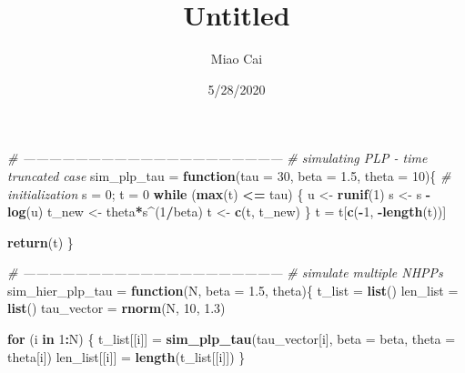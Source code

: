 \documentclass[
]{article}
\title{Untitled}
\author{Miao Cai}
\date{5/28/2020}
\newenvironment{Shaded}{\begin{snugshade}}{\end{snugshade}}
\newcommand{\CommentTok}[1]{\textcolor[rgb]{0.56,0.35,0.01}{\textit{#1}}}
\newcommand{\ControlFlowTok}[1]{\textcolor[rgb]{0.13,0.29,0.53}{\textbf{#1}}}
\newcommand{\DataTypeTok}[1]{\textcolor[rgb]{0.13,0.29,0.53}{#1}}
\newcommand{\DecValTok}[1]{\textcolor[rgb]{0.00,0.00,0.81}{#1}}
\newcommand{\FloatTok}[1]{\textcolor[rgb]{0.00,0.00,0.81}{#1}}
\newcommand{\KeywordTok}[1]{\textcolor[rgb]{0.13,0.29,0.53}{\textbf{#1}}}
\newcommand{\NormalTok}[1]{#1}
\newcommand{\OperatorTok}[1]{\textcolor[rgb]{0.81,0.36,0.00}{\textbf{#1}}}
\newcommand{\StringTok}[1]{\textcolor[rgb]{0.31,0.60,0.02}{#1}}
\begin{document}
\maketitle

\begin{Shaded}
\begin{Highlighting}[]
\CommentTok{# ------------------------------------------------------------}
\CommentTok{# simulating PLP - time truncated case}
\NormalTok{sim_plp_tau =}\StringTok{ }\ControlFlowTok{function}\NormalTok{(}\DataTypeTok{tau =} \DecValTok{30}\NormalTok{,}
                       \DataTypeTok{beta =} \FloatTok{1.5}\NormalTok{,}
                       \DataTypeTok{theta =} \DecValTok{10}\NormalTok{)\{}
  \CommentTok{# initialization}
\NormalTok{  s =}\StringTok{ }\DecValTok{0}\NormalTok{; t =}\StringTok{ }\DecValTok{0}
  \ControlFlowTok{while}\NormalTok{ (}\KeywordTok{max}\NormalTok{(t) }\OperatorTok{<=}\StringTok{ }\NormalTok{tau) \{}
\NormalTok{    u <-}\StringTok{ }\KeywordTok{runif}\NormalTok{(}\DecValTok{1}\NormalTok{)}
\NormalTok{    s <-}\StringTok{ }\NormalTok{s }\OperatorTok{-}\StringTok{ }\KeywordTok{log}\NormalTok{(u)}
\NormalTok{    t_new <-}\StringTok{ }\NormalTok{theta}\OperatorTok{*}\NormalTok{s}\OperatorTok{^}\NormalTok{(}\DecValTok{1}\OperatorTok{/}\NormalTok{beta)}
\NormalTok{    t <-}\StringTok{ }\KeywordTok{c}\NormalTok{(t, t_new)}
\NormalTok{  \}}
\NormalTok{  t =}\StringTok{ }\NormalTok{t[}\KeywordTok{c}\NormalTok{(}\OperatorTok{-}\DecValTok{1}\NormalTok{, }\OperatorTok{-}\KeywordTok{length}\NormalTok{(t))]}

  \KeywordTok{return}\NormalTok{(t)}
\NormalTok{\}}

\CommentTok{# ------------------------------------------------------------}
\CommentTok{# simulate multiple NHPPs}
\NormalTok{sim_hier_plp_tau =}\StringTok{ }\ControlFlowTok{function}\NormalTok{(N, }\DataTypeTok{beta =} \FloatTok{1.5}\NormalTok{, theta)\{}
\NormalTok{  t_list =}\StringTok{ }\KeywordTok{list}\NormalTok{()}
\NormalTok{  len_list =}\StringTok{ }\KeywordTok{list}\NormalTok{()}
\NormalTok{  tau_vector =}\StringTok{ }\KeywordTok{rnorm}\NormalTok{(N, }\DecValTok{10}\NormalTok{, }\FloatTok{1.3}\NormalTok{)}

  \ControlFlowTok{for}\NormalTok{ (i }\ControlFlowTok{in} \DecValTok{1}\OperatorTok{:}\NormalTok{N) \{}
\NormalTok{    t_list[[i]] =}\StringTok{ }\KeywordTok{sim_plp_tau}\NormalTok{(tau_vector[i], }\DataTypeTok{beta =}\NormalTok{ beta, }\DataTypeTok{theta =}\NormalTok{ theta[i])}
\NormalTok{    len_list[[i]] =}\StringTok{ }\KeywordTok{length}\NormalTok{(t_list[[i]])}
\NormalTok{  \}}


\end{Highlighting}
\end{Shaded}
\end{document}
